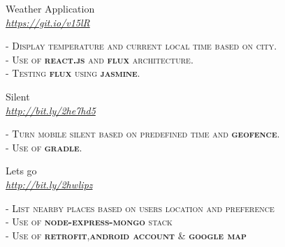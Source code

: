 \documentclass[10pt]{article} %
\begin{document}
{\begin{minipage}[t]{0.5\textwidth}


{\raggedright\large Weather Application \\
	\textit{\href {https://github.com/Bitaron/js/tree/weather}{https://git.io/v15lR}}\\[5pt]}
\textsc{- Display temperature and current local time based on city.}\\
\textsc{- Use of \textbf{react.js} and \textbf{flux} architecture.}\\
\textsc{- Testing \textbf{flux} using \textbf{jasmine}.}\\




{\raggedright\large Silent \\
	\textit{\href {https://dl.dropboxusercontent.com/u/84146203/projects/android/silent.apk}{http://bit.ly/2he7hd5}}\\[5pt]}
\textsc{- Turn mobile silent based on predefined time and \textbf{geofence}.}\\
\textsc{- Use of \textbf{gradle}.}\\




{\raggedright\large Lets go \\
	\textit{\href {https://dl.dropboxusercontent.com/u/84146203/projects/android/letsgo.apk}{http://bit.ly/2hwlipz}}\\[5pt]}
\textsc{- List nearby places based on users location and preference}\\
\textsc{- Use of \textbf{node-express-mongo} stack}\\
\textsc{- Use of \textbf{retrofit},\textbf{android account} \& \textbf{google map}}\\



\end{minipage} %
\hfill
\begin{minipage}[t]{0.44\textwidth} %
\vspace{0pt} %



\end{minipage}}
\end{document}
